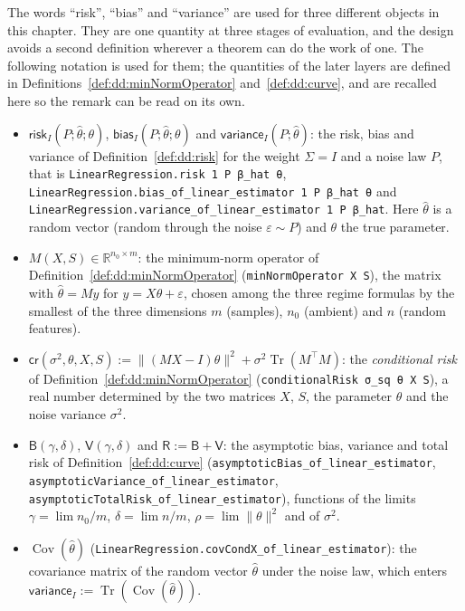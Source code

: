 \begin{remark}\label{rmk:dd:threeLayers}
The words ``risk'', ``bias'' and ``variance'' are used for three different objects in this chapter. They are one quantity at three stages of evaluation, and the design avoids a second definition wherever a theorem can do the work of one.
The following notation is used for them; the quantities of the later layers are defined in Definitions~\ref{def:dd:minNormOperator} and~\ref{def:dd:curve}, and are recalled here so the remark can be read on its own.
\begin{itemize}
  \item $\mathsf{risk}_I(P;\hat\theta;\theta)$, $\mathsf{bias}_I(P;\hat\theta;\theta)$ and $\mathsf{variance}_I(P;\hat\theta)$: the risk, bias and variance of Definition~\ref{def:dd:risk} for the weight $\Sigma=I$ and a noise law $P$, that is \texttt{LinearRegression.risk 1 P β\_hat θ}, \texttt{LinearRegression.bias\_of\_linear\_estimator 1 P β\_hat θ} and \texttt{LinearRegression.variance\_of\_linear\_estimator 1 P β\_hat}. Here $\hat\theta$ is a random vector (random through the noise $\varepsilon\sim P$) and $\theta$ the true parameter.
  \item $M(X,S)\in\mathbb R^{n_0\times m}$: the minimum-norm operator of Definition~\ref{def:dd:minNormOperator} (\texttt{minNormOperator X S}), the matrix with $\hat\theta=My$ for $y=X\theta+\varepsilon$, chosen among the three regime formulas by the smallest of the three dimensions $m$ (samples), $n_0$ (ambient) and $n$ (random features).
  \item $\mathsf{cr}(\sigma^2,\theta,X,S):=\|(MX-I)\theta\|^2+\sigma^2\operatorname{Tr}(M^\top M)$: the \emph{conditional risk} of Definition~\ref{def:dd:minNormOperator} (\texttt{conditionalRisk σ\_sq θ X S}), a real number determined by the two matrices $X$, $S$, the parameter $\theta$ and the noise variance $\sigma^2$.
  \item $\mathsf B(\gamma,\delta)$, $\mathsf V(\gamma,\delta)$ and $\mathsf R:=\mathsf B+\mathsf V$: the asymptotic bias, variance and total risk of Definition~\ref{def:dd:curve} (\texttt{asymptoticBias\_of\_linear\_estimator}, \texttt{asymptoticVariance\_of\_linear\_estimator}, \texttt{asymptoticTotalRisk\_of\_linear\_estimator}), functions of the limits $\gamma=\lim n_0/m$, $\delta=\lim n/m$, $\rho=\lim\|\theta\|^2$ and of $\sigma^2$.
  \item $\operatorname{Cov}(\hat\theta)$ (\texttt{LinearRegression.covCondX\_of\_linear\_estimator}): the covariance matrix of the random vector $\hat\theta$ under the noise law, which enters $\mathsf{variance}_I:=\operatorname{Tr}(\operatorname{Cov}(\hat\theta))$.

\end{itemize}
\end{remark}
